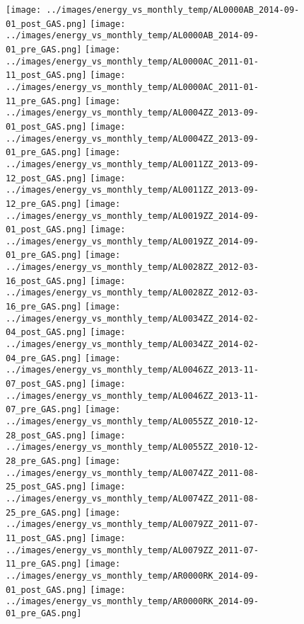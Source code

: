 \begin{figure}
\centering
\texttt{[image: ../images/energy\_vs\_monthly\_temp/AL0000AB\_2014-09-01\_post\_GAS.png]}
\texttt{[image: ../images/energy\_vs\_monthly\_temp/AL0000AB\_2014-09-01\_pre\_GAS.png]}
\texttt{[image: ../images/energy\_vs\_monthly\_temp/AL0000AC\_2011-01-11\_post\_GAS.png]}
\texttt{[image: ../images/energy\_vs\_monthly\_temp/AL0000AC\_2011-01-11\_pre\_GAS.png]}
\texttt{[image: ../images/energy\_vs\_monthly\_temp/AL0004ZZ\_2013-09-01\_post\_GAS.png]}
\texttt{[image: ../images/energy\_vs\_monthly\_temp/AL0004ZZ\_2013-09-01\_pre\_GAS.png]}
\texttt{[image: ../images/energy\_vs\_monthly\_temp/AL0011ZZ\_2013-09-12\_post\_GAS.png]}
\texttt{[image: ../images/energy\_vs\_monthly\_temp/AL0011ZZ\_2013-09-12\_pre\_GAS.png]}
\texttt{[image: ../images/energy\_vs\_monthly\_temp/AL0019ZZ\_2014-09-01\_post\_GAS.png]}
\texttt{[image: ../images/energy\_vs\_monthly\_temp/AL0019ZZ\_2014-09-01\_pre\_GAS.png]}
\texttt{[image: ../images/energy\_vs\_monthly\_temp/AL0028ZZ\_2012-03-16\_post\_GAS.png]}
\texttt{[image: ../images/energy\_vs\_monthly\_temp/AL0028ZZ\_2012-03-16\_pre\_GAS.png]}
\texttt{[image: ../images/energy\_vs\_monthly\_temp/AL0034ZZ\_2014-02-04\_post\_GAS.png]}
\texttt{[image: ../images/energy\_vs\_monthly\_temp/AL0034ZZ\_2014-02-04\_pre\_GAS.png]}
\texttt{[image: ../images/energy\_vs\_monthly\_temp/AL0046ZZ\_2013-11-07\_post\_GAS.png]}
\texttt{[image: ../images/energy\_vs\_monthly\_temp/AL0046ZZ\_2013-11-07\_pre\_GAS.png]}
\texttt{[image: ../images/energy\_vs\_monthly\_temp/AL0055ZZ\_2010-12-28\_post\_GAS.png]}
\texttt{[image: ../images/energy\_vs\_monthly\_temp/AL0055ZZ\_2010-12-28\_pre\_GAS.png]}
\texttt{[image: ../images/energy\_vs\_monthly\_temp/AL0074ZZ\_2011-08-25\_post\_GAS.png]}
\texttt{[image: ../images/energy\_vs\_monthly\_temp/AL0074ZZ\_2011-08-25\_pre\_GAS.png]}
\texttt{[image: ../images/energy\_vs\_monthly\_temp/AL0079ZZ\_2011-07-11\_post\_GAS.png]}
\texttt{[image: ../images/energy\_vs\_monthly\_temp/AL0079ZZ\_2011-07-11\_pre\_GAS.png]}
\texttt{[image: ../images/energy\_vs\_monthly\_temp/AR0000RK\_2014-09-01\_post\_GAS.png]}
\texttt{[image: ../images/energy\_vs\_monthly\_temp/AR0000RK\_2014-09-01\_pre\_GAS.png]}
\end{figure}
